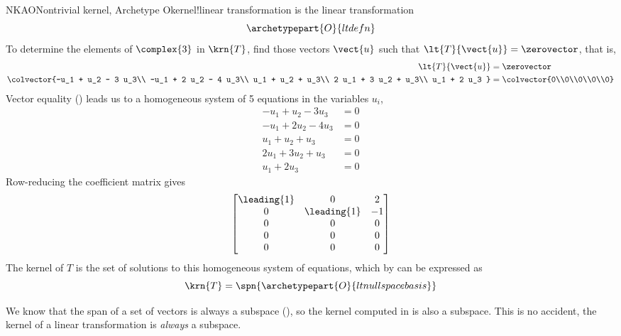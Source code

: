 \begin{example}{NKAO}{Nontrivial kernel, Archetype O}{kernel!linear transformation}
 is the linear transformation
%
\begin{equation*}
\archetypepart{O}{ltdefn}
\end{equation*}
%
To determine the elements of $\complex{3}$ in $\krn{T}$, find those vectors $\vect{u}$ such that $\lt{T}{\vect{u}}=\zerovector$, that is,
%
\begin{align*}
\lt{T}{\vect{u}}&=\zerovector\\
\colvector{-u_1 + u_2 - 3 u_3\\
-u_1 + 2 u_2 - 4 u_3\\
u_1 + u_2 + u_3\\
2 u_1 + 3 u_2 + u_3\\ 
u_1 + 2 u_3
}
&=
\colvector{0\\0\\0\\0\\0}
%
\end{align*}
%
Vector equality () leads us to a homogeneous system of 5 equations in the variables $u_i$,
%
\begin{align*}
-u_1 + u_2 - 3 u_3&=0\\
-u_1 + 2 u_2 - 4 u_3&=0\\
u_1 + u_2 + u_3&=0\\
2 u_1 + 3 u_2 + u_3&=0\\ 
u_1 + 2 u_3&=0
\end{align*}
%
Row-reducing the coefficient matrix gives
%
\begin{equation*}
\begin{bmatrix}
\leading{1} & 0 & 2\\
0 & \leading{1} & -1\\
0 & 0 & 0\\
0 & 0 & 0\\
0 & 0 & 0
\end{bmatrix}
\end{equation*}
%
The kernel of $T$ is the set of solutions to this homogeneous system of equations, which by  can be expressed as
%
\begin{equation*}
\krn{T}=\spn{\archetypepart{O}{ltnullspacebasis}}
\end{equation*}
%
\end{example}
%
We know that the span of a set of vectors is always a subspace (), so the kernel computed in  is also a subspace.  This is no accident, the kernel of a linear transformation is {\em always} a subspace.
